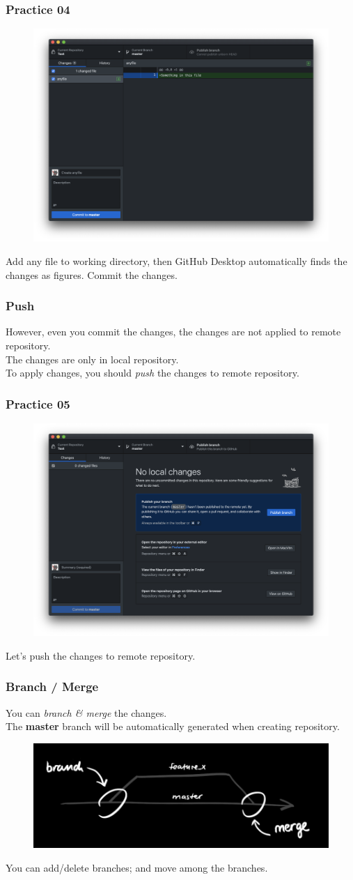 \documentclass[aspectratio=169]{beamer}
\begin{document}
	\begin{frame}
		\frametitle{Practice 04}
		\begin{figure}
			\centering
			\includegraphics[width=0.5 \linewidth]{figures/4.png}
		\end{figure}
		Add any file to working directory, then GitHub Desktop automatically finds the changes as figures. Commit the changes. 
	\end{frame}

	\begin{frame}
		\frametitle{Push}
		
		However, even you commit the changes, the changes are not applied to remote repository. \\
		The changes are only in local repository. \\
		To apply changes, you should \textit{push} the changes to remote repository. 
	\end{frame}

	\begin{frame}
		\frametitle{Practice 05}
		\begin{figure}
			\centering
			\includegraphics[width=0.5 \linewidth]{figures/5.png}
		\end{figure}
		Let's push the changes to remote repository. 
	\end{frame}

	\begin{frame}
		\frametitle{Branch / Merge}
		You can \textit{branch \& merge} the changes. \\
		The \textbf{master} branch will be automatically generated when creating repository. 
		\begin{figure}
			\centering
			\includegraphics[width=0.5 \linewidth]{figures/branches.png}
		\end{figure}
		You can add/delete branches; and move among the branches. 
	\end{frame}
\end{document}
